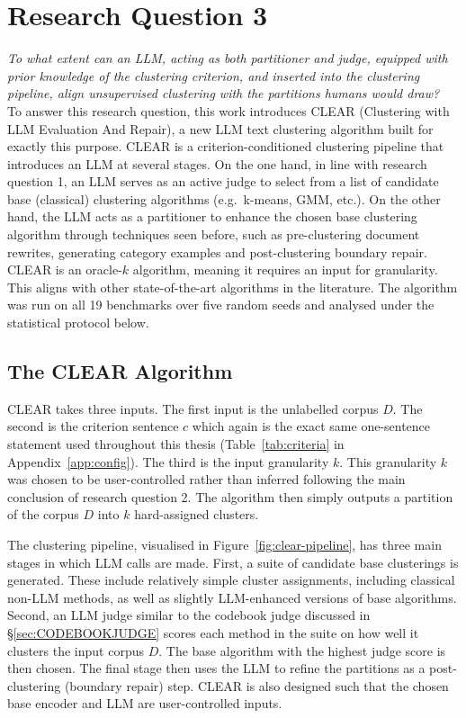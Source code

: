 \documentclass[11pt,a4paper,oneside]{report}
\begin{document}
\section{Research Question 3}

\emph{To what extent can an LLM, acting as both partitioner and judge, equipped with prior knowledge of the clustering criterion, and inserted into the clustering pipeline, align unsupervised clustering with the partitions humans would draw?}\\

To answer this research question, this work introduces CLEAR (Clustering with LLM Evaluation And Repair), a new LLM text clustering algorithm built for exactly this purpose. CLEAR is a criterion-conditioned clustering pipeline that introduces an LLM at several stages. On the one hand, in line with research question 1, an LLM serves as an active judge to select from a list of candidate base (classical) clustering algorithms (e.g.\ k-means, GMM, etc.). On the other hand, the LLM acts as a partitioner to enhance the chosen base clustering algorithm through techniques seen before, such as pre-clustering document rewrites, generating category examples and post-clustering boundary repair. CLEAR is an oracle-$k$ algorithm, meaning it requires an input for granularity. This aligns with other state-of-the-art algorithms in the literature. The algorithm was run on all 19 benchmarks over five random seeds and analysed under the statistical protocol below.

\subsection{The CLEAR Algorithm}

CLEAR takes three inputs. The first input is the unlabelled corpus $D$. The second is the criterion sentence $c$ which again is the exact same one-sentence statement used throughout this thesis (Table~\ref{tab:criteria} in Appendix~\ref{app:config}). The third is the input granularity $k$. This granularity $k$ was chosen to be user-controlled rather than inferred following the main conclusion of research question 2. The algorithm then simply outputs a partition of the corpus $D$ into $k$ hard-assigned clusters.

The clustering pipeline, visualised in Figure~\ref{fig:clear-pipeline}, has three main stages in which LLM calls are made. First, a suite of candidate base clusterings is generated. These include relatively simple cluster assignments, including classical non-LLM methods, as well as slightly LLM-enhanced versions of base algorithms. Second, an LLM judge similar to the codebook judge discussed in \S\ref{sec:CODEBOOKJUDGE} scores each method in the suite on how well it clusters the input corpus $D$. The base algorithm with the highest judge score is then chosen. The final stage then uses the LLM to refine the partitions as a post-clustering (boundary repair) step. CLEAR is also designed such that the chosen base encoder and LLM are user-controlled inputs.
\end{document}
